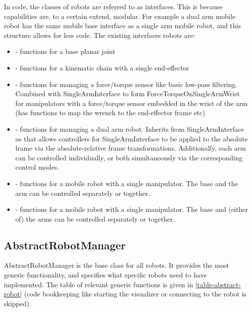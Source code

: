 In code, the classes of robots are referred to as interfaces.
This is because capabilities are, to a certain extend, modular. For example
a dual arm mobile robot has the same mobile base interface as a single arm mobile robot,
and this structure allows for less code.
The existing interfaces robots are:
\begin{itemize}
		\item {} - functions for a base planar joint 
		\item {} - functions for a kinematic chain with a single end-effector
		\item {} - functions for managing a force/torque sensor like 
				basic low-pass filtering. Combined with SingleArmInterface 
				to form ForceTorqueOnSingleArmWrist for manipulators
				with a force/torque sensor embedded in the wrist of the arm
				(has functions to map the wrench to the end-effector frame etc)
		\item {} - functions for managing a dual arm robot. Inherits 
				from SingleArmInterface as that allows controllers for SingleArmInterface
				to be applied to the absolute frame via the absolute-relative
				frame transformations. Additionally, each arm can be controlled individually,
				or both simultaneously
				via the corresponding control modes.
		\item {} - functions for a mobile robot with a single manipulator.
				The base and the arm can be controlled separately or together.
		\item {} - functions for a mobile robot with a single manipulator.
				The base and (either of) the arms can be controlled separately or together.
\end{itemize}

\subsection{AbstractRobotManager}
AbstractRobotManager is the base class for all robots. 
It provides the most generic functionality,
and specifies what specific robots need to have implemented.
The table of relevant generic functions 
is given in \ref{table-abstract-robot} (code bookkeeping like
starting the visualizer or connecting to the robot is skipped).


